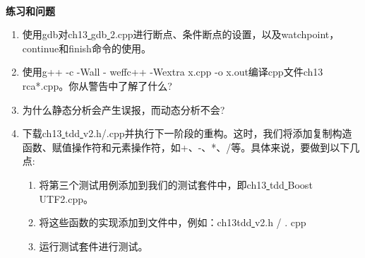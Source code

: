 \noindent\textbf{}\ \par
\textbf{练习和问题} \ \par
\begin{enumerate}
	\item 使用gdb对ch13\underline{ }gdb\underline{ }2.cpp进行断点、条件断点的设置，以及watchpoint，continue和finish命令的使用。
	\item 使用g++ -c -Wall - weffc++ -Wextra x.cpp -o x.out编译cpp文件ch13\underline{ }rca*.cpp。你从警告中了解了什么?
	\item 为什么静态分析会产生误报，而动态分析不会?
	\item 下载ch13\underline{ }tdd\underline{ }v2.h/.cpp并执行下一阶段的重构。这时，我们将添加复制构造函数、赋值操作符和元素操作符，如+、-、*、/等。具体来说，要做到以下几点:
	\begin{enumerate}
		\item 将第三个测试用例添加到我们的测试套件中，即ch13\underline{ }tdd\underline{ }Boost\underline{ }UTF2.cpp。
		\item 将这些函数的实现添加到文件中，例如：ch13tdd\underline{ }v2.h / . cpp
		\item 运行测试套件进行测试。
	\end{enumerate}
\end{enumerate}

\newpage